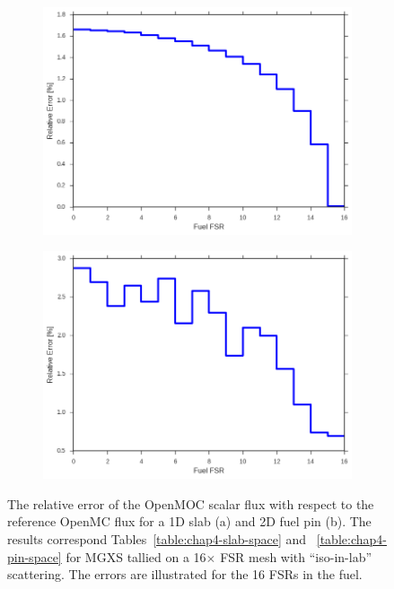\begin{figure}[H]
\begin{subfigure}{.5\textwidth}
  \centering
  \includegraphics[width=\linewidth]{figures/biases/slab/rel-err-fuel-fsrs}
  \caption{}
\end{subfigure}
\begin{subfigure}{.5\textwidth}
  \centering
  \includegraphics[width=\linewidth]{figures/biases/pin-cell/rel-err-fuel-fsrs}
  \caption{}
\end{subfigure}
\caption[Flux relative error by FSR]{The relative error of the OpenMOC scalar flux with respect to the reference OpenMC flux for a 1D slab (a) and 2D fuel pin (b). The results correspond Tables~\ref{table:chap4-slab-space} and ~\ref{table:chap4-pin-space} for \ac{MGXS} tallied on a 16$\times$ \ac{FSR} mesh with ``iso-in-lab'' scattering. The errors are illustrated for the 16 \ac{FSR}s in the fuel.}
\label{fig:chap4-slab-flux}
\end{figure}

